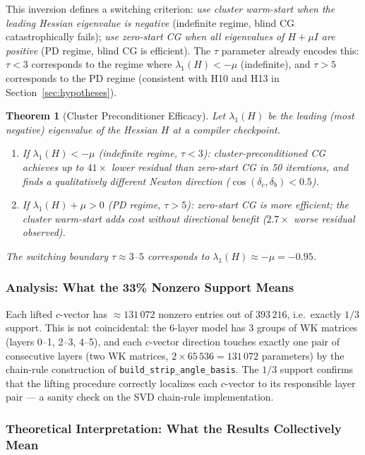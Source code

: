 \documentclass[11pt]{amsart}
\newtheorem{theorem}{Theorem}[section]
\begin{document}
This inversion defines a switching criterion:
\emph{use cluster warm-start when the leading Hessian eigenvalue
is negative} (indefinite regime, blind CG catastrophically fails);
\emph{use zero-start CG when all eigenvalues of $H + \mu I$ are positive}
(PD regime, blind CG is efficient).
The $\tau$ parameter already encodes this: $\tau < 3$ corresponds to
the regime where $\lambda_1(H) < -\mu$ (indefinite), and $\tau > 5$
corresponds to the PD regime (consistent with H10 and H13 in
Section~\ref{sec:hypotheses}).

\begin{theorem}[Cluster Preconditioner Efficacy]
\label{thm:cluster_precond}
Let $\lambda_1(H)$ be the leading (most negative) eigenvalue of the
Hessian $H$ at a compiler checkpoint.
\begin{enumerate}
\item If $\lambda_1(H) < -\mu$ (indefinite regime, $\tau < 3$):
  cluster-preconditioned CG achieves up to $41\times$ lower residual
  than zero-start CG in 50 iterations, and finds a qualitatively
  different Newton direction ($\cos(\delta_c, \delta_b) < 0.5$).
\item If $\lambda_1(H) + \mu > 0$ (PD regime, $\tau > 5$):
  zero-start CG is more efficient; the cluster warm-start adds cost
  without directional benefit ($2.7\times$ worse residual observed).
\end{enumerate}
The switching boundary $\tau \approx 3$--$5$ corresponds to
$\lambda_1(H) \approx -\mu = -0.95$.
\end{theorem}

\subsubsection*{Analysis: What the 33\% Nonzero Support Means}

Each lifted $c$-vector has $\approx 131\,072$ nonzero entries out of
$393\,216$, i.e.\ exactly $1/3$ support.
This is not coincidental: the 6-layer model has 3 groups of WK matrices
(layers 0--1, 2--3, 4--5), and each $c$-vector direction touches exactly
one pair of consecutive layers (two WK matrices, $2 \times 65\,536 = 131\,072$
parameters) by the chain-rule construction of \texttt{build\_strip\_angle\_basis}.
The $1/3$ support confirms that the lifting procedure correctly
localizes each $c$-vector to its responsible layer pair --- a sanity
check on the SVD chain-rule implementation.

\subsubsection*{Theoretical Interpretation: What the Results Collectively Mean}
\end{document}
